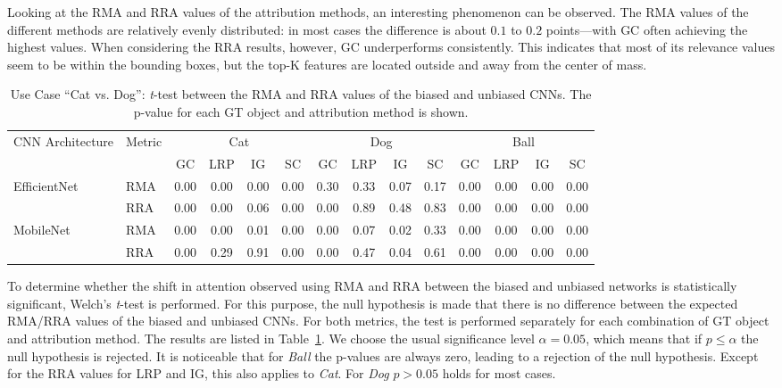 \documentclass[runningheads]{llncs}
\newcommand{\Tab}[1]{Table~\ref{#1}}
\begin{document}
Looking at the RMA and RRA values of the attribution methods, an interesting phenomenon can be observed. The RMA values of the different methods are relatively evenly distributed: in most cases the difference is about $0.1$ to $0.2$ points---with GC often achieving the highest values. When considering the RRA results, however, GC underperforms consistently. This indicates that most of its relevance values seem to be within the bounding boxes, but the top-K features are located outside and away from the center of mass.


\begin{table}[t]
\begin{center}
\caption{Use Case \enquote{Cat vs. Dog}: \emph{t}-test between the RMA and RRA values of the biased and unbiased CNNs. The p-value for each GT object and attribution method is shown.}
\begin{tabular}{l | l || cccc | cccc | cccc }
     \multirow{2}{*}{CNN Architecture}             & \multirow{2}{*}{Metric}  & \multicolumn{4}{c|}{Cat}  & \multicolumn{4}{c|}{Dog}   & \multicolumn{4}{c}{Ball}  \\ 
                                  &         & GC & LRP & IG & SC & GC & LRP & IG & SC & GC & LRP & IG & SC \\ \hline
    \multirow{2}{*}{EfficientNet} & RMA     & 0.00 & 0.00 & 0.00 & 0.00 & 0.30 & 0.33 & 0.07 & 0.17 & 0.00 & 0.00 & 0.00 & 0.00 \\
                                  & RRA     & 0.00 & 0.00 & 0.06 & 0.00 & 0.00 & 0.89 & 0.48 & 0.83 & 0.00 & 0.00 & 0.00 & 0.00 \\ \hline
    \multirow{2}{*}{MobileNet}    & RMA     & 0.00 & 0.00 & 0.01 & 0.00 & 0.00 & 0.07 & 0.02 & 0.33 & 0.00 & 0.00 & 0.00 & 0.00 \\
                                  & RRA     & 0.00 & 0.29 & 0.91 & 0.00 & 0.00 & 0.47 & 0.04 & 0.61 & 0.00 & 0.00 & 0.00 & 0.00 \\ 
\end{tabular}
\label{tab:pvalues-imgnet}
\vspace{-6mm}
\end{center}
\end{table}

To determine whether the shift in attention observed using RMA and RRA between the biased and unbiased networks is statistically significant, Welch's \emph{t}-test is performed. For this purpose, the null hypothesis is made that there is no difference between the expected RMA/RRA values of the biased and unbiased CNNs. For both metrics, the test is performed separately for each combination of GT object and attribution method. The results are listed in \Tab{tab:pvalues-imgnet}. We choose the usual significance level $\alpha = 0.05$, which means that if $p \leq \alpha $ the null hypothesis is rejected. It is noticeable that for \emph{Ball} the p-values are always zero, leading to a rejection of the null hypothesis. Except for the RRA values for LRP and IG, this also applies to \emph{Cat}. For \emph{Dog} $p > 0.05$ holds for most cases.
\end{document}
